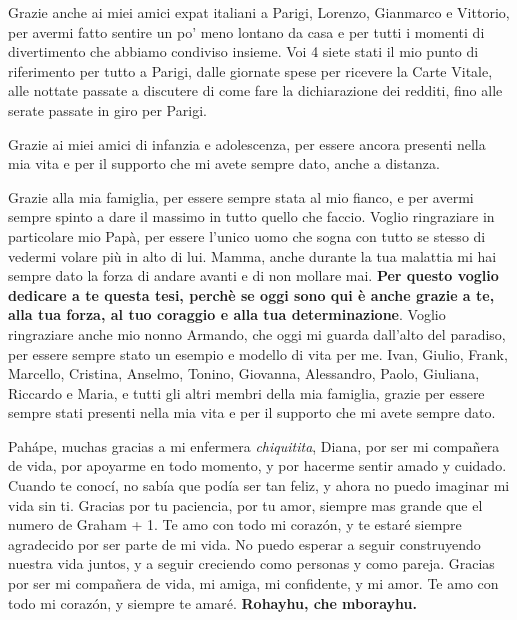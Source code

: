 \smallskip
Grazie anche ai miei amici expat italiani a Parigi, Lorenzo, Gianmarco e Vittorio, per avermi fatto sentire un po' meno lontano da casa e per tutti i momenti di divertimento che abbiamo condiviso insieme. Voi 4 siete stati il mio punto di riferimento per tutto a Parigi, dalle giornate spese per ricevere la Carte Vitale, alle nottate passate a discutere di come fare la dichiarazione dei redditi, fino alle serate passate in giro per Parigi. 

\smallskip
Grazie ai miei amici di infanzia e adolescenza, per essere ancora presenti nella mia vita e per il supporto che mi avete sempre dato, anche a distanza. 

\smallskip
Grazie alla mia famiglia, per essere sempre stata al mio fianco, e per avermi sempre spinto a dare il massimo in tutto quello che faccio. Voglio ringraziare in particolare mio Papà, per essere l'unico uomo che sogna con tutto se stesso di vedermi volare più in alto di lui. Mamma, anche durante la tua malattia mi hai sempre dato la forza di andare avanti e di non mollare mai. \textbf{Per questo voglio dedicare a te questa tesi, perchè se oggi sono qui è anche grazie a te, alla tua forza, al tuo coraggio e alla tua determinazione}. Voglio ringraziare anche mio nonno Armando, che oggi mi guarda dall'alto del paradiso, per essere sempre stato un esempio e modello di vita per me. Ivan, Giulio, Frank, Marcello, Cristina, Anselmo, Tonino, Giovanna, Alessandro, Paolo, Giuliana, Riccardo e Maria, e tutti gli altri membri della mia famiglia, grazie per essere sempre stati presenti nella mia vita e per il supporto che mi avete sempre dato.


\smallskip
Pahápe, muchas gracias a mi enfermera \textit{chiquitita}, Diana, por ser mi compañera de vida, por apoyarme en todo momento, y por hacerme sentir amado y cuidado. Cuando te conocí, no sabía que podía ser tan feliz, y ahora no puedo imaginar mi vida sin ti. Gracias por tu paciencia, por tu amor, siempre mas grande que el numero de Graham + 1. Te amo con todo mi corazón, y te estaré siempre agradecido por ser parte de mi vida. No puedo esperar a seguir construyendo nuestra vida juntos, y a seguir creciendo como personas y como pareja. Gracias por ser mi compañera de vida, mi amiga, mi confidente, y mi amor. Te amo con todo mi corazón, y siempre te amaré.
\textbf{Rohayhu, che mborayhu.}
